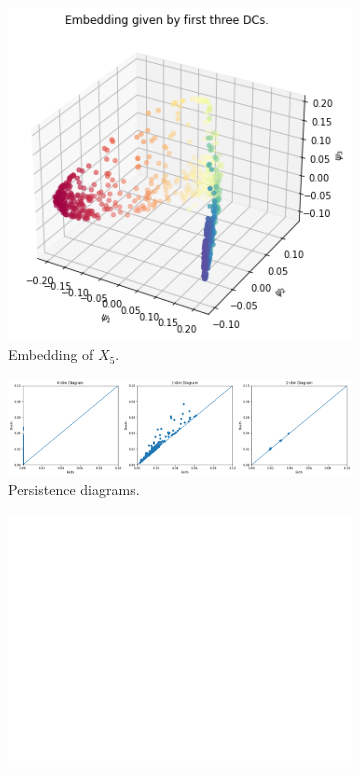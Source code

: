 \begin{figure}[H]
\centering
\begin{subfigure}[b]{0.2\textwidth}
    \includegraphics[width=\textwidth]{figures/topology/X5_embedding.png}
    \caption{Embedding of  $X_5$.}
\end{subfigure}
\hfill
\begin{subfigure}[b]{0.75\textwidth}
    \includegraphics[width=\textwidth]{figures/topology/X5_H0.png}
    \caption{Persistence diagrams.}
\end{subfigure}
\begin{subfigure}[b]{0.25\textwidth}
\includegraphics[width=\textwidth]{figures/topology/white.png} 

\end{subfigure}
\end{figure}
